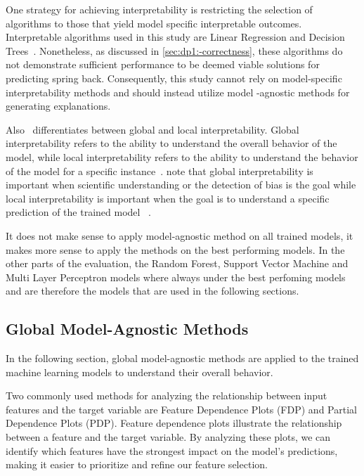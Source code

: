 
One strategy for achieving interpretability is restricting the selection of algorithms to those that yield
model specific interpretable outcomes.
Interpretable algorithms used in this study are Linear Regression and Decision
Trees~\cite[p. 35]{molnar2020interpretable}.
Nonetheless, as discussed in \cref{sec:dp1:-correctness}, these algorithms do not demonstrate sufficient
performance to be deemed viable solutions for predicting spring back.
Consequently, this study cannot rely on model-specific interpretability methods and should instead utilize model
-agnostic methods for generating explanations.

Also~\cite{doshi2017towards} differentiates between global and local interpretability.
Global interpretability refers to the ability to understand the overall behavior of
the model, while local interpretability refers to the ability to understand the behavior of the
model for a specific instance~\cite[p. 7]{doshi2017towards}.
\cite{doshi2017towards} note that global interpretability is important when scientific understanding or the detection
of bias is the goal while local interpretability is important when the goal is to understand a specific prediction of
the trained model
~\cite[p. 7]{doshi2017towards}.

It does not make sense to apply model-agnostic method on all trained models, it makes more sense to
apply the methods on the best performing models.
In the other parts of the evaluation, the Random Forest, Support Vector Machine and Multi Layer Perceptron models
where always under the best perfoming models and are therefore the models that are used in the following
sections.

\subsection{Global Model-Agnostic Methods}\label{subsec:global-model-agnostic-methods}
In the following section, global model-agnostic methods are applied to the trained machine learning models to
understand their overall behavior.

Two commonly used methods for analyzing the relationship between input features
and the target variable are Feature Dependence Plots (FDP) and Partial Dependence Plots (PDP).
Feature dependence plots illustrate the relationship between a feature and the target variable.
By analyzing these plots, we can identify which features have the strongest impact on the model's
predictions, making it easier to prioritize and refine our feature selection.


